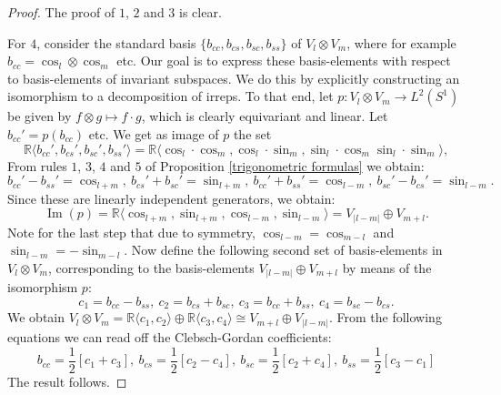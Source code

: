 \documentclass[12pt, a4paper]{article}
\theoremstyle{plain}
\theoremstyle{definition}
\theoremstyle{remark}
\newcommand{\R}{\mathds{R}}
\DeclareMathOperator{\im}{Im}
\begin{document}
\begin{proof}
The proof of $1$, $2$ and $3$ is clear.

For $4$, consider the standard basis $\{b_{cc}, b_{cs}, b_{sc}, b_{ss}\}$ of $V_{l} \otimes V_m$, where for example $b_{cc} = \cos_l \otimes \cos_m$ etc. Our goal is to express these basis-elements with respect to basis-elements of invariant subspaces. We do this by explicitly constructing an isomorphism to a decomposition of irreps. To that end, let $p: V_l \otimes V_m \to L^2(S^1)$ be given by $f \otimes g \mapsto f \cdot g$, which is clearly equivariant and linear. Let $b_{cc}' = p(b_{cc})$ etc. We get as image of $p$ the set
\begin{equation*}
\R \langle b_{cc}', b_{cs}', b_{sc}', b_{ss}' \rangle  = \R\langle \cos_l \cdot \cos_m, \cos_l \cdot \sin_m, \sin_l \cdot \cos_m \sin_l \cdot \sin_m\rangle,
\end{equation*}
From rules $1$, $3$, $4$ and $5$ of Proposition \ref{trigonometric formulas} we obtain:
\begin{equation*}
b_{cc}' - b_{ss}' = \cos_{l+m}, \ b_{cs}' + b_{sc}' = \sin_{l+m}, \ b_{cc}' + b_{ss}' = \cos_{l-m}, \ b_{sc}' - b_{cs}' = \sin_{l-m}.
\end{equation*}
Since these are linearly independent generators, we obtain:
\begin{equation*}
\im(p) = \R \langle \cos_{l+m}, \sin_{l+m}, \cos_{l-m}, \sin_{l-m}\rangle = V_{|l-m|} \oplus V_{m+l} .
\end{equation*}
Note for the last step that due to symmetry, $\cos_{l-m} = \cos_{m-l}$ and $\sin_{l-m} = - \sin_{m-l}$. Now define the following second set of basis-elements in $V_l \otimes V_m$, corresponding to the basis-elements $V_{|l-m|} \oplus V_{m+l}$ by means of the isomorphism $p$:
\begin{equation*}
c_1 = b_{cc} - b_{ss}, \ c_2 = b_{cs} + b_{sc}, \  c_3 = b_{cc} + b_{ss}, \  c_{4} = b_{sc} - b_{cs}.
\end{equation*}
We obtain $V_l \otimes V_m = \R\langle c_1, c_2\rangle \oplus \R\langle c_3, c_4\rangle \cong V_{m+l} \oplus V_{|l-m|}$. From the following equations we can read off the Clebsch-Gordan coefficients:
\begin{equation*}
b_{cc} = \frac{1}{2} \left[ c_1 + c_3\right], \  b_{cs} = \frac{1}{2} \left[ c_2 - c_4\right], \  b_{sc} = \frac{1}{2} \left[ c_2 + c_4 \right], \  b_{ss} = \frac{1}{2} \left[ c_3 - c_1\right]
\end{equation*}
The result follows.


\end{proof}
\end{document}
